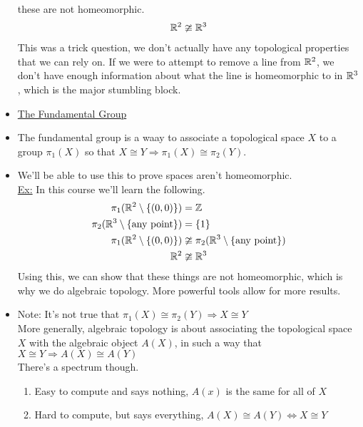 \begin{itemize}
            these are not homeomorphic.
            \begin{align*}
                \mathbb{R}^2 \ncong \mathbb{R}^3\\
            \end{align*}
            This was a trick question, we don't actually have any topological properties that we can rely on. If we were
            to attempt to remove a line from $\mathbb{R}^2$, we don't have enough information about what the line is homeomorphic to
            in $\mathbb{R}^3$, which is the major stumbling block.
        \item\underline{The Fundamental Group}
        \item The fundamental group is a waay to associate a topological space $X$ to a group $\pi_1(X)$ so that
            $X\cong Y \Rightarrow \pi_1(X)\cong\pi_2(Y)$. 
        \item We'll be able to use this to prove spaces aren't homeomorphic.\\
            \underline{Ex:} In this course we'll learn the following.
            \begin{align*}
                \pi_1(\mathbb{R}^2\setminus\{(0,0)\})&=\mathbb{Z}\\
                \pi_2(\mathbb{R}^3\setminus\{\text{any point}\})&=\{1\}\\
                \pi_1(\mathbb{R}^2\setminus\{(0,0)\})&\ncong \pi_2(\mathbb{R}^3\setminus\{\text{any point}\})\\
                \mathbb{R}^2&\ncong\mathbb{R}^3\\
            \end{align*}
            Using this, we can show that these things are not homeomorphic, which is why we do algebraic topology.
            More powerful tools allow for more results.
        \item Note: It's not true that $\pi_1(X)\cong \pi_2(Y)\Rightarrow X\cong Y$\\
            More generally, algebraic topology is about associating the topological space $X$ 
            with the algebraic object $A(X)$, in such a way that $X\cong Y \Rightarrow A(X)\cong A(Y)$\\
            There's a spectrum though.
            \begin{enumerate}
                \item Easy to compute and says nothing, $A(x)$ is the same for all of $X$
                \item Hard to compute, but says everything, $A(X)\cong A(Y) \iff X\cong Y$
            \end{enumerate}
    \end{itemize}
